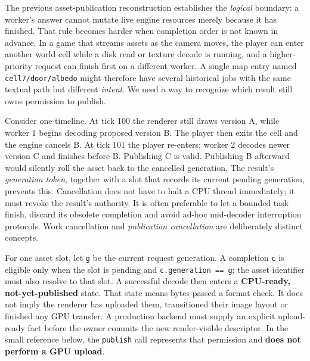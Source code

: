 \hypertarget{06-engine-ii-ch027-from-a-simulated-asset-job-to-real-concurrent-decoding-gregory-integration}{}

The previous asset-publication reconstruction establishes the \emph{logical} boundary: a worker's answer cannot mutate live engine resources merely because it has finished. That rule becomes harder when completion order is not known in advance. In a game that streams assets as the camera moves, the player can enter another world cell while a disk read or texture decode is running, and a higher-priority request can finish first on a different worker. A single map entry named \texttt{cell7/door/albedo} might therefore have several historical jobs with the same textual path but different \emph{intent}. We need a way to recognize which result still owns permission to publish.

Consider one timeline. At tick 100 the renderer still draws version A, while worker 1 begins decoding proposed version B. The player then exits the cell and the engine cancels B. At tick 101 the player re-enters; worker 2 decodes newer version C and finishes before B. Publishing C is valid. Publishing B afterward would silently roll the asset back to the cancelled generation. The result's \emph{generation token}, together with a slot that records its current pending generation, prevents this. Cancellation does not have to halt a CPU thread immediately; it must revoke the result's authority. It is often preferable to let a bounded task finish, discard its obsolete completion and avoid ad-hoc mid-decoder interruption protocols. Work cancellation and \emph{publication cancellation} are deliberately distinct concepts.

For one asset slot, let \texttt{g} be the current request generation. A completion \texttt{c} is eligible only when the slot is pending and \texttt{c.generation\ ==\ g}; the asset identifier must also resolve to that slot. A successful decode then enters a \textbf{CPU-ready, not-yet-published} state. That state means bytes passed a format check. It does not imply the renderer has uploaded them, transitioned their image layout or finished any GPU transfer. A production backend must supply an explicit upload-ready fact before the owner commits the new render-visible descriptor. In the small reference below, the \texttt{publish} call represents that permission and \textbf{does not perform a GPU upload}.

